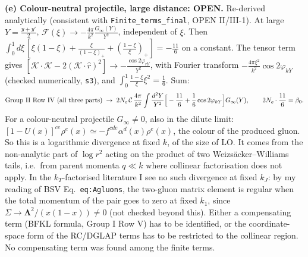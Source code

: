 \noindent\textbf{(e) Colour-neutral projectile, large distance: OPEN.} Re-derived analytically (consistent with \texttt{Finite\_terms\_final}, OPEN II/III-1). At large $Y=\frac{y+y'}{2}$, $\mathcal F(\xi)\to-\frac{4\pi}{k^{2}}\frac{G_{\infty}(Y)}{Y^{2}}$, independent of $\xi$. Then $\int_{0}^{1}d\xi\,[\xi(1-\xi)+\frac{\xi}{(1-\xi)_{+}}+(\frac{1-\xi}{\xi})_{+}]=-\frac{11}{6}$ on a constant. The tensor term gives $[\mathcal K\cdot\mathcal K-2(\mathcal K\cdot\hat r)^{2}]\to-\frac{\cos2\varphi_{rY}}{Y^{2}}$, with Fourier transform $-\frac{4\pi\xi^{2}}{k^{2}}\cos2\varphi_{kY}$ (checked numerically, \texttt{s3}), and $\int_{0}^{1}\frac{1-\xi}{\xi}\xi^{2}=\frac16$. Sum:
\begin{align}
\text{Group II Row IV (all three parts)}\;\to\;2N_{c}\,\mathcal C\,\frac{4\pi}{k^{2}}\int\frac{d^{2}Y}{Y^{2}}\Big[-\frac{11}{6}+\frac16\cos2\varphi_{kY}\Big]G_{\infty}(Y),\qquad 2N_{c}\cdot\frac{11}{6}=\beta_{0}.\notag
\end{align}
For a colour-neutral projectile $G_{\infty}\neq0$, also in the dilute limit: $[1-U(x)]^{ce}\rho^{e}(x)\simeq-f^{cde}\alpha^{d}(x)\rho^{e}(x)$, the colour of the produced gluon. So this is a logarithmic divergence at fixed $k$, of the size of LO. It comes from the non-analytic part of $\log r^{2}$ acting on the product of two Weizs\"acker--Williams tails, i.e.\ from parent momenta $q\ll k$ where collinear factorisation does not apply. In the $k_{T}$-factorised literature I see no such divergence at fixed $k_{J}$: by my reading of BSV Eq.~\texttt{eq:Agluons}, the two-gluon matrix element is regular when the total momentum of the pair goes to zero at fixed $k_{1}$, since $\Sigma\to\boldsymbol\Lambda^{2}/(x(1-x))\neq0$ (not checked beyond this). Either a compensating term (BFKL formula, Group I Row V) has to be identified, or the coordinate-space form of the RC/DGLAP terms has to be restricted to the collinear region. No compensating term was found among the finite terms.

